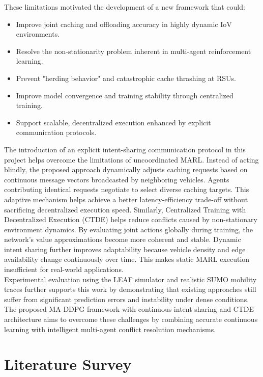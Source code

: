 \documentclass[12pt,a4paper]{report}
\begin{document}
These limitations motivated the development of a new framework that could:
\begin{itemize}
    \item Improve joint caching and offloading accuracy in highly dynamic IoV environments.
    \item Resolve the non-stationarity problem inherent in multi-agent reinforcement learning.
    \item Prevent "herding behavior" and catastrophic cache thrashing at RSUs.
    \item Improve model convergence and training stability through centralized training.
    \item Support scalable, decentralized execution enhanced by explicit communication protocols.
\end{itemize}

The introduction of an explicit intent-sharing communication protocol in this project helps overcome the limitations of uncoordinated MARL. Instead of acting blindly, the proposed approach dynamically adjusts caching requests based on continuous message vectors broadcasted by neighboring vehicles. Agents contributing identical requests negotiate to select diverse caching targets. This adaptive mechanism helps achieve a better latency-efficiency trade-off without sacrificing decentralized execution speed. Similarly, Centralized Training with Decentralized Execution (CTDE) helps reduce conflicts caused by non-stationary environment dynamics. By evaluating joint actions globally during training, the network's value approximations become more coherent and stable. Dynamic intent sharing further improves adaptability because vehicle density and edge availability change continuously over time. This makes static MARL execution insufficient for real-world applications.\\

Experimental evaluation using the LEAF simulator and realistic SUMO mobility traces further supports this work by demonstrating that existing approaches still suffer from significant prediction errors and instability under dense conditions. The proposed MA-DDPG framework with continuous intent sharing and CTDE architecture aims to overcome these challenges by combining accurate continuous learning with intelligent multi-agent conflict resolution mechanisms.

\chapter{Literature Survey}
\end{document}
